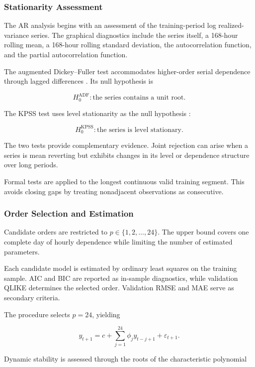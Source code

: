 \subsubsection{Stationarity Assessment}

The AR analysis begins with an assessment of the training-period
log realized-variance series. The graphical diagnostics include
the series itself, a 168-hour rolling mean, a 168-hour rolling
standard deviation, the autocorrelation function, and the
partial autocorrelation function.

The augmented Dickey--Fuller test accommodates higher-order
serial dependence through lagged differences
\citep{saiddickey1984}. Its null hypothesis is

\[
H_0^{\mathrm{ADF}}:
\text{the series contains a unit root}.
\]

The KPSS test uses level stationarity as the null hypothesis
\citep{kpss1992}:

\[
H_0^{\mathrm{KPSS}}:
\text{the series is level stationary}.
\]

The two tests provide complementary evidence. Joint rejection
can arise when a series is mean reverting but exhibits changes
in its level or dependence structure over long periods.

Formal tests are applied to the longest continuous valid
training segment. This avoids closing gaps by treating
nonadjacent observations as consecutive.

\subsubsection{Order Selection and Estimation}

Candidate orders are restricted to
\(p\in\{1,2,\ldots,24\}\). The upper bound covers one complete
day of hourly dependence while limiting the number of estimated
parameters.

Each candidate model is estimated by ordinary least squares on
the training sample. AIC and BIC are reported as in-sample
diagnostics, while validation QLIKE determines the selected
order. Validation RMSE and MAE serve as secondary criteria.

The procedure selects \(p=24\), yielding

\begin{equation}
y_{t+1}
=
c
+
\sum_{j=1}^{24}
\phi_j y_{t-j+1}
+
\varepsilon_{t+1}.
\label{eq:ar24-model}
\end{equation}

Dynamic stability is assessed through the roots of the
characteristic polynomial

